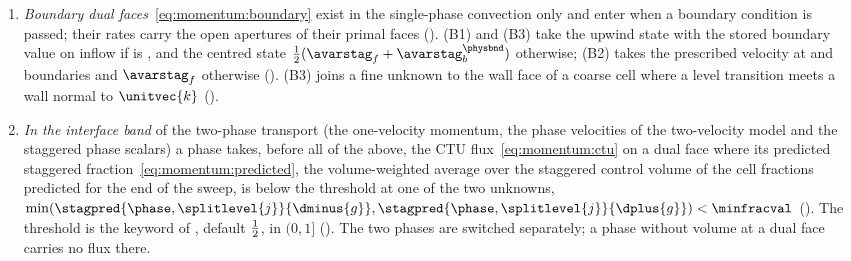 \begin{sloppypar}
\begin{enumerate}
  to a wall normal to $\unitvec{k}$ in the single-phase schedule, which has
  no unknown on the wall, or the two unknowns lie on one line normal to
  $\unitvec{\faxis{g}}$, as two segments of one side
  (,
  ,
  ). The
  phase schedules search the upstream unknown among all unknowns, the
  boundary unknowns included.
\item \emph{Boundary dual faces}~\cref{eq:momentum:boundary} exist in the
  single-phase convection only and enter when a boundary condition is passed;
  their rates carry the open apertures of their primal faces
  ().
  (B1) and (B3) take the upwind state with the stored
  boundary value on inflow if  is ,
  and the centred state $\half(\avarstag_f+\avarstag^{\physbnd}_b)$ otherwise;
  (B2) takes the prescribed velocity at  and 
  boundaries and $\avarstag_f$ otherwise
  ().
  (B3) joins a fine unknown to the wall face of a coarse cell where a level
  transition meets a wall normal to $\unitvec{k}$
  ().
\item \emph{In the interface band} of the two-phase transport (the
  one-velocity momentum, the phase velocities of the two-velocity model and
  the staggered phase scalars) a phase takes, before all of the above, the
  CTU flux~\cref{eq:momentum:ctu} on a dual face where its predicted
  staggered fraction~\cref{eq:momentum:predicted}, the volume-weighted
  average over the staggered control volume of the cell fractions predicted
  for the end of the sweep, is below the threshold at one of the two
  unknowns, $\min(\stagpred{\phase,\splitlevel{j}}{\dminus{g}},\stagpred{\phase,\splitlevel{j}}{\dplus{g}})<\minfracval$
  (). The
  threshold is the keyword  of
  , default $\frac{1}{2}$, in $(0,1]$
  (). The two phases are
  switched separately; a phase without volume at a dual face carries no flux
  there.
\end{enumerate}
\end{sloppypar}

